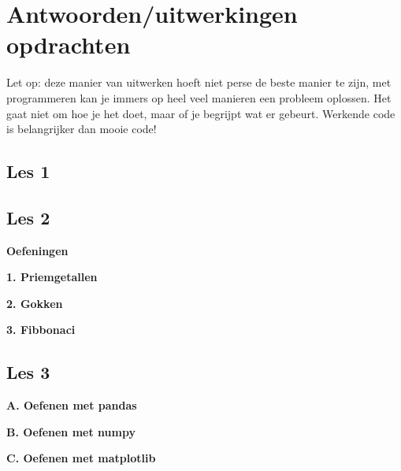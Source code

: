 \chapter{Antwoorden/uitwerkingen opdrachten}
Let op: deze manier van uitwerken hoeft niet perse de beste manier te zijn, met programmeren kan je immers op heel veel manieren een probleem oplossen. Het gaat niet om hoe je het doet, maar of je begrijpt wat er gebeurt. Werkende code is belangrijker dan mooie code!

\section{Les 1}





\section{Les 2}
\textbf{Oefeningen}




\textbf{1. Priemgetallen}


\textbf{2. Gokken}


\textbf{3. Fibbonaci}


\section{Les 3}
\textbf{A. Oefenen met pandas}

\textbf{B. Oefenen met numpy}

\textbf{C. Oefenen met matplotlib}
